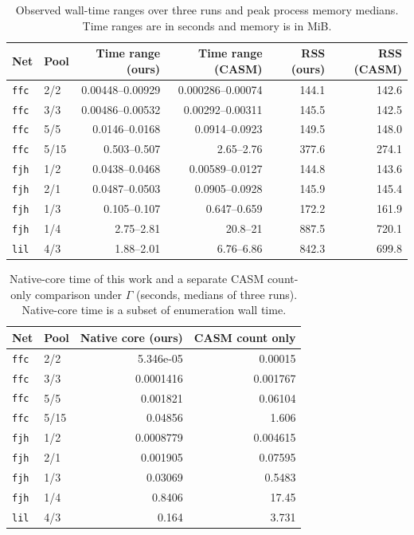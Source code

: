 \documentclass[a5paper, 10pt]{article}
\begin{document}
\begin{table}[H]
\centering\scriptsize
\setlength{\tabcolsep}{1mm}
\caption{Observed wall-time ranges over three runs and peak process memory medians. Time ranges are in seconds and memory is in MiB.}
\begin{tabular}{llrrrr}
\toprule
Net & Pool & Time range (ours) & Time range (CASM) & RSS (ours) & RSS (CASM) \\
\midrule
\texttt{ffc} & 2/2 & 0.00448--0.00929 & 0.000286--0.00074 & 144.1 & 142.6 \\
\texttt{ffc} & 3/3 & 0.00486--0.00532 & 0.00292--0.00311 & 145.5 & 142.5 \\
\texttt{ffc} & 5/5 & 0.0146--0.0168 & 0.0914--0.0923 & 149.5 & 148.0 \\
\texttt{ffc} & 5/15 & 0.503--0.507 & 2.65--2.76 & 377.6 & 274.1 \\
\texttt{fjh} & 1/2 & 0.0438--0.0468 & 0.00589--0.0127 & 144.8 & 143.6 \\
\texttt{fjh} & 2/1 & 0.0487--0.0503 & 0.0905--0.0928 & 145.9 & 145.4 \\
\texttt{fjh} & 1/3 & 0.105--0.107 & 0.647--0.659 & 172.2 & 161.9 \\
\texttt{fjh} & 1/4 & 2.75--2.81 & 20.8--21 & 887.5 & 720.1 \\
\texttt{lil} & 4/3 & 1.88--2.01 & 6.76--6.86 & 842.3 & 699.8 \\
\bottomrule
\end{tabular}
\end{table}

\begin{table}[H]
\centering\scriptsize
\caption{Native-core time of this work and a separate CASM count-only comparison under $\Gamma$ (seconds, medians of three runs). Native-core time is a subset of enumeration wall time.}
\begin{tabular}{llrr}
\toprule
Net & Pool & Native core (ours) & CASM count only \\
\midrule
\texttt{ffc} & 2/2 & 5.346e-05 & 0.00015 \\
\texttt{ffc} & 3/3 & 0.0001416 & 0.001767 \\
\texttt{ffc} & 5/5 & 0.001821 & 0.06104 \\
\texttt{ffc} & 5/15 & 0.04856 & 1.606 \\
\texttt{fjh} & 1/2 & 0.0008779 & 0.004615 \\
\texttt{fjh} & 2/1 & 0.001905 & 0.07595 \\
\texttt{fjh} & 1/3 & 0.03069 & 0.5483 \\
\texttt{fjh} & 1/4 & 0.8406 & 17.45 \\
\texttt{lil} & 4/3 & 0.164 & 3.731 \\
\bottomrule
\end{tabular}
\end{table}
\end{document}
